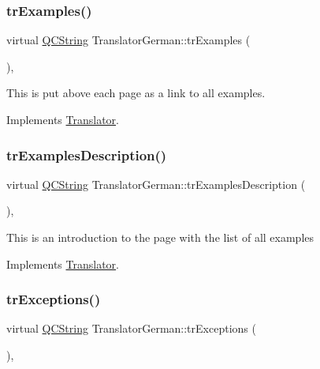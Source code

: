 \subsubsection{\texorpdfstring{trExamples()}{trExamples()}}
{\footnotesize\ttfamily virtual \mbox{\hyperlink{class_q_c_string}{Q\+C\+String}} Translator\+German\+::tr\+Examples (\begin{DoxyParamCaption}{ }\end{DoxyParamCaption})\hspace{0.3cm}{\ttfamily [inline]}, {\ttfamily [virtual]}}

This is put above each page as a link to all examples. 

Implements \mbox{\hyperlink{class_translator}{Translator}}.

\mbox{\label{class_translator_german_a143d559232d873527104233e9623ee50}} 
\subsubsection{\texorpdfstring{trExamplesDescription()}{trExamplesDescription()}}
{\footnotesize\ttfamily virtual \mbox{\hyperlink{class_q_c_string}{Q\+C\+String}} Translator\+German\+::tr\+Examples\+Description (\begin{DoxyParamCaption}{ }\end{DoxyParamCaption})\hspace{0.3cm}{\ttfamily [inline]}, {\ttfamily [virtual]}}

This is an introduction to the page with the list of all examples 

Implements \mbox{\hyperlink{class_translator}{Translator}}.

\mbox{\label{class_translator_german_a52930d6ef40b8d44cfda146f3710f72c}} 
\subsubsection{\texorpdfstring{trExceptions()}{trExceptions()}}
{\footnotesize\ttfamily virtual \mbox{\hyperlink{class_q_c_string}{Q\+C\+String}} Translator\+German\+::tr\+Exceptions (\begin{DoxyParamCaption}{ }\end{DoxyParamCaption})\hspace{0.3cm}{\ttfamily [inline]}, {\ttfamily [virtual]}}

